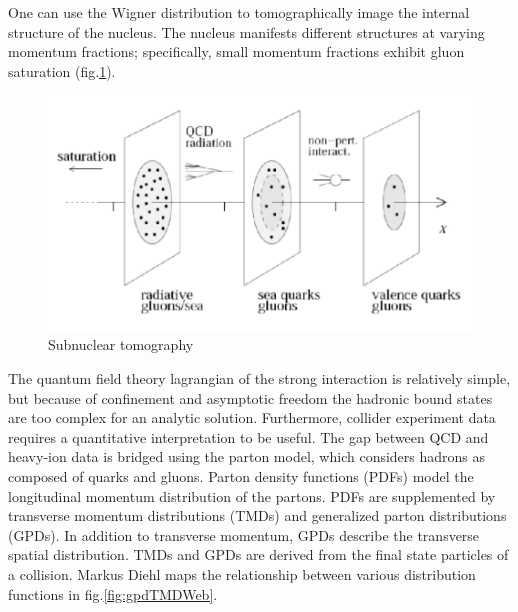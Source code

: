 One can use the Wigner distribution to tomographically image the internal structure of the nucleus. The nucleus manifests different structures at varying momentum fractions; specifically, small momentum fractions exhibit gluon saturation (fig.\ref{fig:nuclImag}).

\begin{figure}[h!]
\begin{centering}
\includegraphics[width=7in]{Chapter2/importfigs/imaging_the_nucleon_upc_dijets_pres.png}
\par\end{centering}
\caption{Subnuclear tomography \label{fig:nuclImag}}
\end{figure}

The quantum field theory lagrangian of the strong interaction is relatively simple, but because of confinement and asymptotic freedom the hadronic bound states are too complex for an analytic solution. Furthermore, collider experiment data requires a quantitative interpretation to be useful. The gap between QCD and heavy-ion data is bridged using the parton model, which considers hadrons as composed of quarks and gluons. Parton density functions (PDFs) model the longitudinal momentum distribution of the partons. PDFs are supplemented by transverse momentum distributions (TMDs) and generalized parton distributions (GPDs). In addition to transverse momentum, GPDs describe the transverse spatial distribution. TMDs and GPDs are derived from the final state particles of a collision. Markus Diehl maps the relationship between various distribution functions in fig.\ref{fig:gpdTMDWeb}.

